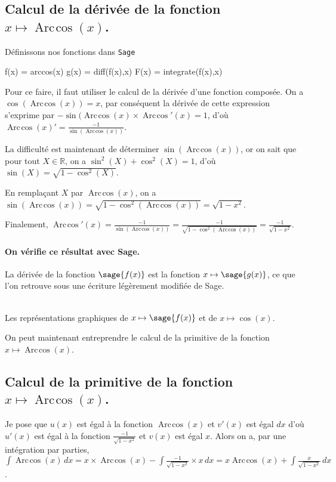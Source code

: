 \documentclass[a4paper,12pt]{report}
\def\eclaire{\mathbb}
\def\R{\ensuremath{\eclaire R}}
\renewcommand{\arccos}{\mathop{\mathrm{Arc\mspace{2mu}cos}}}
\begin{document}
\subsection{Calcul de la dérivée de la fonction $x \mapsto \arccos(x) $.}
Définissons nos fonctions dans {\texttt{Sage}}
\begin{sageblock}
    f(x) = arccos(x)
    g(x) = diff(f(x),x)
    F(x) = integrate(f(x),x)
\end{sageblock}

Pour ce faire, il faut utiliser le calcul de la dérivée d'une fonction composée. On a $\cos(\arccos(x))=x$, par conséquent la dérivée de cette expression s'exprime par $ -\sin(\arccos(x) \times \arccos\nolimits'(x) = 1$, d'où $\arccos(x)' = \frac{-1}{\sin(\arccos(x))} $.

La difficulté est maintenant de déterminer $\sin(\arccos(x))$, or on sait que pour tout $X \in \R$, on a $\sin^2(X) + \cos^2(X) = 1$, d'où $\sin(X) = \sqrt{1-\cos^2(X)}$.

En remplaçant $X$ par $\arccos(x)$, 
on a $\sin(\arccos(x)) = \sqrt{1-\cos^2(\arccos(x))} = \sqrt{1- x^2}$.

Finalement, $\arccos\nolimits'(x) = \frac{-1}{\sin(\arccos(x))} = \frac{-1}{\sqrt{1-\cos^2(\arccos(x))}} =  \frac{-1}{\sqrt{1- x^2}} $.
\paragraph{On vérifie ce résultat avec Sage.}
La dérivée de la fonction $\sage{f(x)}$ est la fonction $x \mapsto \sage{g(x)} $, ce que l'on retrouve sous une écriture légèrement modifiée de Sage.


\begin{center}
\\
Les représentations graphiques de $x \mapsto \sage{f(x)} $ et de $x\mapsto \cos(x)$.
\end{center}

On peut maintenant entreprendre le calcul de la primitive de la  fonction  $x \mapsto \arccos(x) $.

\subsection{Calcul de la primitive de la fonction  $x \mapsto \arccos(x) $.}
Je pose que $u(x)$  est égal à la fonction $\arccos(x)$ et $v'(x)$ est égal $dx$  d'où $u'(x)$  est égal à la fonction $ \frac{-1}{\sqrt{1- x^2}} $ et $v(x)$ est égal $x$.
Alors on a, par une intégration par parties, $\int \arccos(x) \, dx = x \times \arccos(x) -\int \frac{-1}{\sqrt{1- x^2}} \times x \, dx =  x \arccos(x) + \int \frac{x}{\sqrt{1- x^2}} \, dx $.
\end{document}
